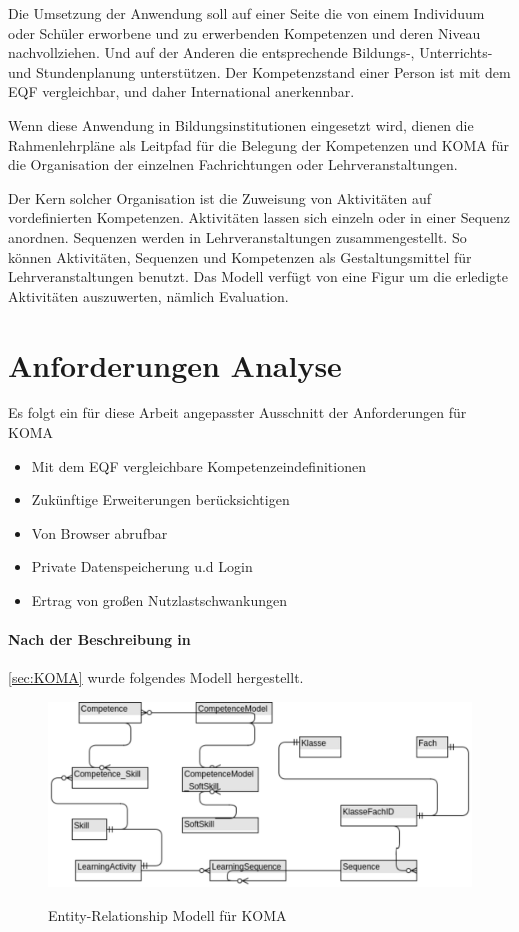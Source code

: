 \documentclass[
12pt,
english,
ngerman,
headsepline,
twoside,
openright,
numbers=noenddot,version=first
]{scrreprt}
\begin{document}
Die Umsetzung der Anwendung soll auf einer Seite die von einem Individuum oder Schüler
erworbene und zu erwerbenden Kompetenzen und deren Niveau nachvollziehen. Und auf der Anderen die entsprechende Bildungs-, Unterrichts- und Stundenplanung unterstützen.
Der Kompetenzstand einer Person ist mit dem \acrshort{EQF} vergleichbar, und daher International anerkennbar.

Wenn diese Anwendung in Bildungsinstitutionen eingesetzt wird, dienen die Rahmenlehrpläne als Leitpfad für die Belegung der Kompetenzen und \acrshort{KOMA} für die Organisation der einzelnen Fachrichtungen oder Lehrveranstaltungen. 

Der Kern solcher Organisation ist die Zuweisung von Aktivitäten auf vordefinierten Kompetenzen. Aktivitäten lassen sich einzeln oder in einer Sequenz anordnen. Sequenzen werden in Lehrveranstaltungen zusammengestellt. So können Aktivitäten, Sequenzen und Kompetenzen
als Gestaltungsmittel für Lehrveranstaltungen benutzt. Das Modell verfügt von eine Figur um die erledigte Aktivitäten auszuwerten, nämlich Evaluation.


\section{Anforderungen Analyse}

Es folgt ein für diese Arbeit angepasster Ausschnitt der Anforderungen für \acrshort{KOMA}


\begin{itemize}
	\item Mit dem EQF vergleichbare Kompetenzeindefinitionen
	\item Zukünftige Erweiterungen berücksichtigen
	\item Von Browser abrufbar
	\item Private Datenspeicherung u.d Login
	\item Ertrag von großen Nutzlastschwankungen
\end{itemize}

\paragraph{Nach der Beschreibung in}\ref{sec:KOMA} wurde folgendes Modell hergestellt. 
\begin{figure}[h]
	\centering
	\includegraphics[scale=1]{./pics/koma-er-concept.eps}
	\label{pic:koma-er-concept}
	\caption{Entity-Relationship Modell für KOMA}
\end{figure}
\end{document}
